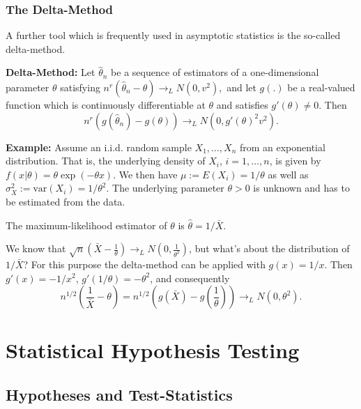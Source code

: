 \documentclass[
]{book}
\begin{document}
\hypertarget{the-delta-method}{%
\subsection{The Delta-Method}\label{the-delta-method}}

A further tool which is frequently used in asymptotic statistics is the so-called delta-method.

\textbf{Delta-Method:} Let \(\widehat{\theta}_n\) be a sequence of estimators of a one-dimensional parameter \(\theta\) satisfying
\(n^{r} (\widehat{\theta}_n-\theta)\rightarrow_L N(0,v^2),\) and let \(g(.)\) be a real-valued function which is continuously differentiable at \(\theta\) and satisfies \(g'(\theta)\neq 0\). Then
\[n^{r} \left(g(\widehat{\theta}_n)-g(\theta)\right) \rightarrow_L  N\left(0,g'(\theta)^2v^2\right).\]

\hfill\break

\textbf{Example:} Assume an i.i.d. random sample \(X_1,\dots,X_n\) from an exponential distribution. That is, the underlying density of \(X_i\), \(i=1,\dots,n\), is given by \(f(x|\theta)=\theta\exp(-\theta x)\). We then have \(\mu:=E(X_i)=1/\theta\) as well as \(\sigma^2_X:=\textrm{var}(X_i)=1/\theta^2\). The underlying parameter \(\theta>0\) is unknown and has to be estimated from the data.

\hfill\break

The maximum-likelihood estimator of \(\theta\) is \(\hat\theta=1/\bar X\).

\hfill\break

We know that \(\sqrt{n}(\bar X-\frac{1}{\theta})\to_L N(0,\frac{1}{\theta^2})\), but what's about the distribution of \(1/\bar X\)? For this purpose the delta-method can be applied with \(g(x)=1/x\). Then \(g'(x)=-1/x^2\), \(g'(1/\theta)=-\theta^2\), and consequently
\[n^{1/2} \left(\frac{1}{\bar X}-\theta\right)=n^{1/2}\left(g\left(\bar X\right)-g\left(\frac{1}{\theta}\right)\right)\rightarrow_L N\left(0,\theta^2\right).\]

\hypertarget{statistical-hypothesis-testing}{%
\chapter{Statistical Hypothesis Testing}\label{statistical-hypothesis-testing}}

\hypertarget{hypotheses-and-test-statistics}{%
\section{Hypotheses and Test-Statistics}\label{hypotheses-and-test-statistics}}
\end{document}
